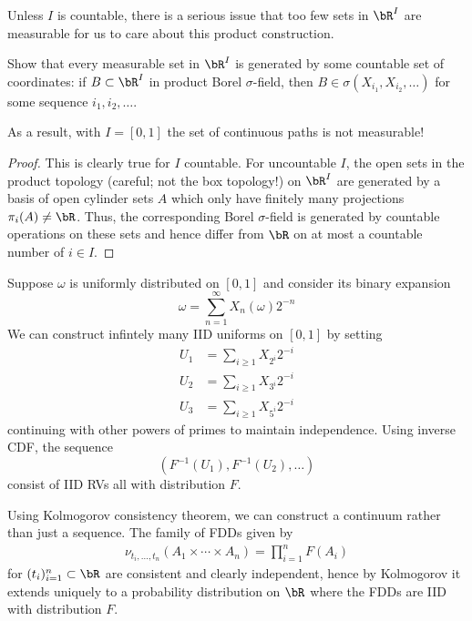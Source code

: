 \begin{remark}
  Unless $I$ is countable, there is a serious issue that too few sets in
  $\bR^I$ are measurable for us to care about this product construction.
\end{remark}

\begin{exercise}
  Show that every measurable set in $\bR^I$ is generated by some countable
  set of coordinates: if $B \subset \bR^I$ in product Borel $\sigma$-field,
  then $B \in \sigma(X_{i_1}, X_{i_2}, \ldots)$ for some sequence $i_1, i_2,
  \ldots$.

  As a result, with $I = [0,1]$ the set of continuous paths is not
  measurable!
\end{exercise}

\begin{proof}
  This is clearly true for $I$ countable.
  For uncountable $I$, the open sets in the product topology
  (careful; not the box topology!) on $\bR^I$ are generated
  by a basis of open cylinder sets $A$ which only have finitely
  many projections $\pi_i(A) \neq \bR$.
  Thus, the corresponding Borel $\sigma$-field is generated
  by countable operations on these sets
  and hence differ from $\bR$ on at most a countable
  number of $i \in I$.
\end{proof}

\begin{example}
  Suppose $\omega$ is uniformly distributed on $[0,1]$ and consider
  its binary expansion 
  \[
    \omega = \sum_{n=1}^\infty X_n(\omega) 2^{-n}
  \]
  We can construct infintely many IID uniforms on $[0,1]$ by setting
  \begin{align*}
    U_1 &= \sum_{i \geq 1} X_{2^i} 2^{-i} \\
    U_2 &= \sum_{i \geq 1} X_{3^i} 2^{-i} \\
    U_3 &= \sum_{i \geq 1} X_{5^i} 2^{-i}
  \end{align*}
  continuing with other powers of primes to maintain independence.
  Using inverse CDF, the sequence
  \[
    (F^{-1}(U_1), F^{-1}(U_2), \ldots)
  \]
  consist of IID RVs all with distribution $F$.

  Using Kolmogorov consistency theorem, we can construct a continuum
  rather than just a sequence.
  The family of FDDs given by
  \begin{align}
    \nu_{t_i,\ldots,t_n}(A_1 \times \cdots \times A_n)
    = \prod_{i=1}^n F(A_i)
  \end{align}
  for $(t_i)_{i=1}^n \subset \bR$ are consistent and clearly independent,
  hence by Kolmogorov it extends uniquely to a probability distribution
  on $\bR$ where the FDDs are IID with distribution $F$.
\end{example}

